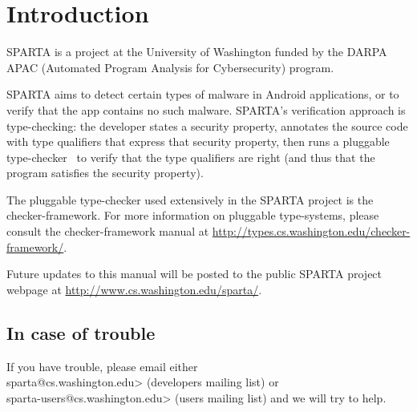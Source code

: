\htmlhr
\chapter{Introduction\label{introduction}}

SPARTA is a project at the University of Washington funded by the DARPA
APAC (Automated Program Analysis for Cybersecurity) program.


SPARTA aims to detect certain types of malware in Android applications, or
to verify that the app contains no such malware.  SPARTA's verification
approach is type-checking:  the developer states a security property,
annotates the source code with type qualifiers that express that security
property, then runs a pluggable type-checker~\cite{PapiACPE2008,DietlDEMS2011} to verify that the type
qualifiers are right (and thus that the program satisfies the security
property).


The pluggable type-checker used extensively in the SPARTA project is the checker-framework. For more information on pluggable type-systems, please consult the checker-framework manual at 
\url{http://types.cs.washington.edu/checker-framework/}.  


Future updates to this manual will be posted to the public SPARTA project webpage at
\url{http://www.cs.washington.edu/sparta/}.


\section{In case of trouble}

If you have trouble, please email either\\
\<sparta@cs.washington.edu>
(developers mailing list) or\\
\<sparta-users@cs.washington.edu> (users
mailing list) and we will try to help.





